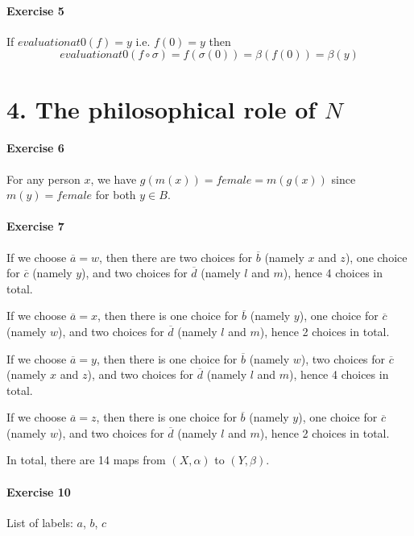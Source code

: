 \documentclass{report}
\begin{document}
    \paragraph{Exercise 5}
    If $evaluation at 0(f) = y$ i.e. $f(0) = y$ then
    \[ evaluation at 0(f \circ \sigma) = f(\sigma(0)) = \beta(f(0)) = \beta(y) \]

    \section{4. The philosophical role of $N$}

    \paragraph{Exercise 6}
    For any person $x$, we have $g(m(x)) = female = m(g(x))$ since $m(y) = female$ for both $y \in B$.

    \paragraph{Exercise 7}
    If we choose $\overline{a} = w$, then there are two choices for $\overline{b}$ (namely $x$ and $z$),
    one choice for $\overline{c}$ (namely $y$), and two choices for $\overline{d}$ (namely $l$ and $m$),
    hence 4 choices in total.

    If we choose $\overline{a} = x$, then there is one choice for $\overline{b}$ (namely $y$), one choice for
    $\overline{c}$ (namely $w$), and two choices for $\overline{d}$ (namely $l$ and $m$),
    hence 2 choices in total.

    If we choose $\overline{a} = y$, then there is one choice for $\overline{b}$ (namely $w$), two choices for
    $\overline{c}$ (namely $x$ and $z$), and two choices for $\overline{d}$ (namely $l$ and $m$),
    hence 4 choices in total.

    If we choose $\overline{a} = z$, then there is one choice for $\overline{b}$ (namely $y$), one choice for
    $\overline{c}$ (namely $w$), and two choices for $\overline{d}$ (namely $l$ and $m$),
    hence 2 choices in total.

    In total, there are 14 maps from $(X, \alpha)$ to $(Y, \beta)$.

    \paragraph{Exercise 10}
    List of labels: $a$, $b$, $c$
\end{document}
